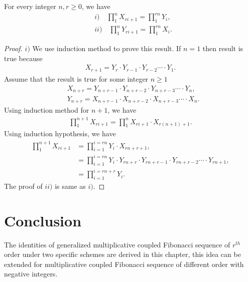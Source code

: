 \begin{theorem}For every integer $n, r\geq0$, we have
\begin{align}
	&i)\quad \displaystyle \prod_{1}^{n}X_{ri+1}=\displaystyle \prod_{1}^{rn}Y_{i},\\
&ii)\quad \displaystyle \prod_{1}^{n}Y_{ri+1}=\displaystyle \prod_{1}^{rn}X_{i}.
\end{align}
\end{theorem}
\begin{proof}$i)$ We use induction method to prove this result. If $n=1$ then result is true because
\begin{align*}
X_{r+1}= Y_{r}\cdot Y_{r-1}\cdot Y_{r-2}\cdots\cdot Y_{1}.
\end{align*}
Assume that the result is true for some integer $n \geq 1$
	\begin{align*}
	&X_{n+r}=Y_{n+r-1}\cdot Y_{n+r-2}\cdot Y_{n+r-3}\cdots\cdot Y_{n}, \\
	&Y_{n+r}=X_{n+r-1}\cdot X_{n+r-2}\cdot X_{n+r-3}\cdots\cdot X_{n}.
	\end{align*}
Using induction method for $n+1$, we have
\begin{align*}
\displaystyle \prod_{1}^{n+1}X_{ri+1}=\displaystyle \prod_{1}^{n}X_{ri+1}\cdot X_{r(n+1)+1}.
\end{align*}
Using induction hypothesis, we have
\begin{align*}
\displaystyle \prod_{1}^{n+1}X_{ri+1}&=\prod_{i=1}^{i=rn}Y_{i}\cdot X_{rn+r+1}, \\
&=\prod_{i=1}^{i=rn}Y_{i}\cdot Y_{rn+r}\cdot Y_{rn+r-1}\cdot Y_{rn+r-2}\cdots \cdot Y_{rn+1},\\
&=\prod_{i=1}^{i=rn+r}Y_{i}.
\end{align*}
\noindent The proof of $ii)$ is same as $i)$.
\end{proof}
\section{Conclusion}
The identities of generalized multiplicative coupled Fibonacci sequence of $r^{th}$ order under two specific schemes are derived in this chapter, this idea can be extended  for multiplicative coupled Fibonacci sequence of different order with negative integers.


